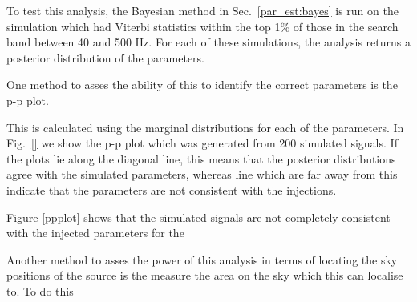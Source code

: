To test this analysis, the Bayesian method in Sec.~\ref{par_est:bayes} is run on the simulation which had Viterbi statistics within the top 1\% of those in the search band between 40 and 500 Hz.
For each of these simulations, the analysis returns a posterior distribution of the parameters.

One method to asses the ability of this to identify the correct parameters is the p-p plot.

This is calculated using the marginal distributions for each of the parameters.
In Fig.~\ref{} we show the p-p plot which was generated from  200 simulated signals.
If the plots lie along the diagonal line, this means that the posterior distributions agree with the simulated parameters, whereas line which are far away from this indicate that the parameters are not consistent with the injections.

Figure \ref{ppplot} shows that the simulated signals are not completely consistent with the injected parameters for the 


Another method to asses the power of this analysis in terms of locating the sky positions of the source is the measure the area on the sky which this can localise to.
To do this 




